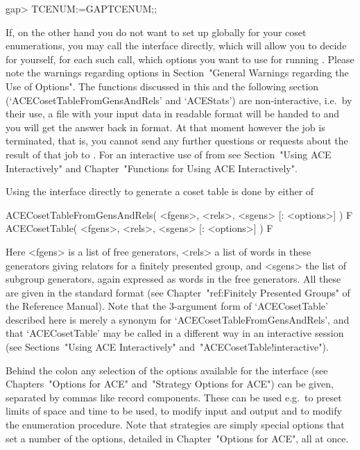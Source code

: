 \beginexample
gap> TCENUM:=GAPTCENUM;;
\endexample


If, on the other hand you do not want to set up  {\ACE}  globally  for
your coset enumerations, you may call the {\ACE}  interface  directly,
which will allow you to decide for yourself, for each such call, which
options you want to use for running {\ACE}. Please note  the  warnings
regarding options in Section~"General Warnings regarding  the  Use  of
Options". The functions discussed in this and  the  following  section
(`ACECosetTableFromGensAndRels' and `ACEStats')  are  non-interactive,
i.e.~by their use, a file with your  input  data  in  {\ACE}  readable
format will be handed to {\ACE} and you will get the  answer  back  in
{\GAP} format. At that moment however the {\ACE}  job  is  terminated,
that is, you cannot send any further questions or requests  about  the
result of that job to {\ACE}. For an interactive use  of  {\ACE}  from
{\GAP} see Section~"Using ACE  Interactively"  and  Chapter~"Functions
for Using ACE Interactively".

Using the {\ACE} interface directly to generate a coset table is  done
by either of

\>ACECosetTableFromGensAndRels( <fgens>, <rels>, <sgens> [: <options>] ) F
\>ACECosetTable( <fgens>, <rels>, <sgens> [: <options>] ) F

Here <fgens> is a list of free generators, <rels> a list of  words  in
these generators giving relators for a finitely presented  group,  and
<sgens> the list of subgroup generators, again expressed as  words  in
the free generators. All these are given in the standard {\GAP} format
(see Chapter~"ref:Finitely Presented Groups" of the  {\GAP}  Reference
Manual). Note that the 3-argument form  of  `ACECosetTable'  described
here is merely a synonym for `ACECosetTableFromGensAndRels', and  that
`ACECosetTable' may be called in a different  way  in  an  interactive
{\ACE}    session    (see    Sections~"Using    ACE     Interactively"
and~"ACECosetTable!interactive").

Behind the colon any  selection  of  the  options  available  for  the
interface (see Chapters~"Options for ACE"  and~"Strategy  Options  for
ACE") can be given, separated by commas like record components.  These
can be used e.g.~to preset limits of space and time  to  be  used,  to
modify input and output and to modify the enumeration procedure.  Note
that strategies are simply special options that set a  number  of  the
options, detailed in Chapter~"Options for ACE", all at once.

